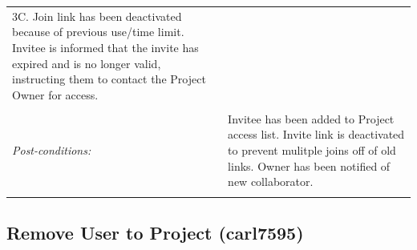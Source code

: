 \documentclass[11pt]{report}
\begin{document}
\begin{tabular}{ p{2cm} p{12cm} }
	3C. Join link has been deactivated because of previous use/time limit. Invitee is informed that the invite has expired and is no longer valid, instructing them to contact the Project Owner for access. \\
 \\
 \textit{Post-conditions:} & Invitee has been added to Project access list. Invite link is deactivated to prevent mulitple joins off of old links. Owner has been notified of new collaborator. \\
 \\
\hline
\end{tabular}

\subsection{Remove User to Project (carl7595)}
\end{document}
